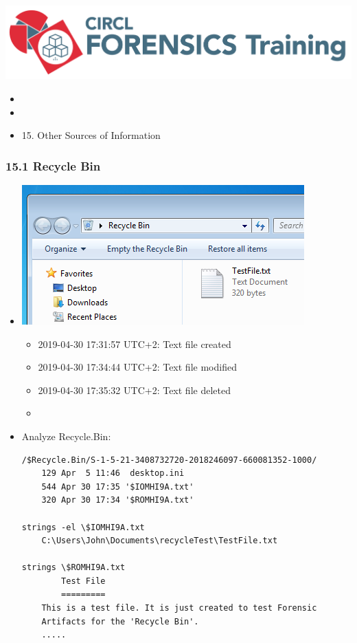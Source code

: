 

\begin{frame}
    \includegraphics[scale=.3]{images/logo-circl-Forensics.png}
    \begin{itemize}
        \item[]
        \item[]
        \item[] 15. Other Sources of Information
    \end{itemize}
\end{frame}


\begin{frame}[fragile]
  \frametitle{15.1 Recycle Bin}
    \begin{itemize}
        \item \includegraphics[scale=.18]{images/f15_recycle.png}
            \begin{itemize}
                \item 2019-04-30 17:31:57 UTC+2: Text file created
		\item 2019-04-30 17:34:44 UTC+2: Text file modified
		\item 2019-04-30 17:35:32 UTC+2: Text file deleted
		\item[]
            \end{itemize}
        \item Analyze Recycle.Bin:
  \begin{lstlisting}[basicstyle=\tiny]
/$Recycle.Bin/S-1-5-21-3408732720-2018246097-660081352-1000/
	129 Apr  5 11:46  desktop.ini
	544 Apr 30 17:35 '$IOMHI9A.txt'
	320 Apr 30 17:34 '$ROMHI9A.txt'

strings -el \$IOMHI9A.txt 
	C:\Users\John\Documents\recycleTest\TestFile.txt

strings \$ROMHI9A.txt 
		Test File
		=========
	This is a test file. It is just created to test Forensic
	Artifacts for the 'Recycle Bin'.
	.....
  \end{lstlisting}
    \end{itemize}
\end{frame}


